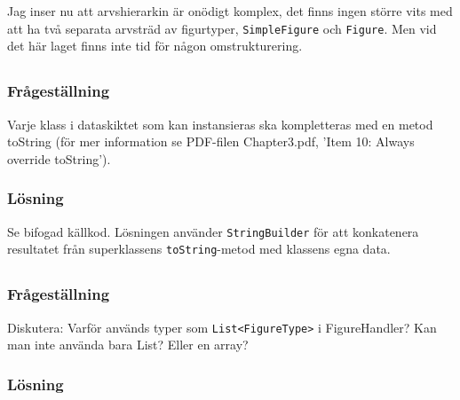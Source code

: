 Jag inser nu att arvshierarkin är onödigt komplex, det finns ingen större vits
med att ha två separata arvsträd av figurtyper, \texttt{SimpleFigure} och
\texttt{Figure}. Men vid det här laget finns inte tid för någon
omstrukturering.


\subsection{}\label{sec:uppg2b}
\subsubsection*{Frågeställning}
Varje klass i dataskiktet som kan instansieras ska kompletteras med en metod
toString (för mer information se PDF-filen Chapter3.pdf, ’Item 10: Always
override toString’).

\subsubsection*{Lösning}
Se bifogad källkod. Lösningen använder \texttt{StringBuilder} för att
konkatenera resultatet från superklassens \texttt{toString}-metod med klassens
egna data.


\subsection{}\label{sec:uppg2c}
\subsubsection*{Frågeställning}
Diskutera: Varför används typer som \texttt{List<FigureType>} i FigureHandler?
Kan man inte använda bara List? Eller en array?


\subsubsection*{Lösning}


